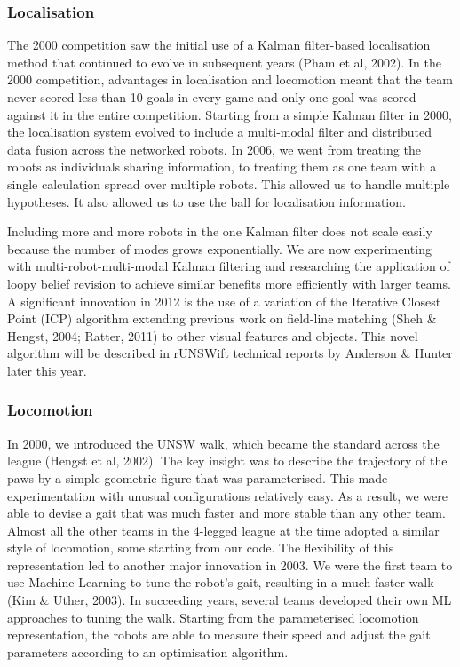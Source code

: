 \documentclass[runningheads,a4paper]{llncs}
\begin{document}
\subsubsection{Localisation}
The 2000 competition saw the initial use of a Kalman filter-based localisation method that continued to evolve in subsequent years (Pham et al, 2002). In the 2000 competition, advantages in localisation and locomotion meant that the team never scored less than 10 goals in every game and only one goal was scored against it in the entire competition. Starting from a simple Kalman filter in 2000, the localisation system evolved to include a multi-modal filter and distributed data fusion across the networked robots. In 2006, we went from treating the robots as individuals sharing information, to treating them as one team with a single calculation spread over multiple robots.  This allowed us to handle multiple hypotheses.  It also allowed us to use the ball for localisation information. 

Including more and more robots in the one Kalman filter does not scale easily because the number of modes grows exponentially. We are now experimenting with multi-robot-multi-modal Kalman filtering and researching the application of loopy belief revision to achieve similar benefits more efficiently with larger teams. A significant innovation in 2012 is the use of a variation of the Iterative Closest Point  (ICP) algorithm extending previous work on field-line matching (Sheh \& Hengst, 2004; Ratter, 2011) to other visual features and objects. This novel algorithm will be described in rUNSWift technical reports by Anderson \& Hunter later this year. 

\subsubsection{Locomotion}
In 2000, we introduced the UNSW walk, which became the standard across the league (Hengst et al, 2002). The key insight was to describe the trajectory of the paws by a simple geometric figure that was parameterised. This made experimentation with unusual configurations relatively easy. As a result, we were able to devise a gait that was much faster and more stable than any other team. Almost all the other teams in the 4-legged league at the time adopted a similar style of locomotion, some starting from our code. The flexibility of this representation led to another major innovation in 2003. We were the first team to use Machine Learning to tune the robot's gait, resulting in a much faster walk (Kim \& Uther, 2003). In succeeding years, several teams developed their own ML approaches to tuning the walk. Starting from the parameterised locomotion representation, the robots are able to measure their speed and adjust the gait parameters according to an optimisation algorithm.
\end{document}
